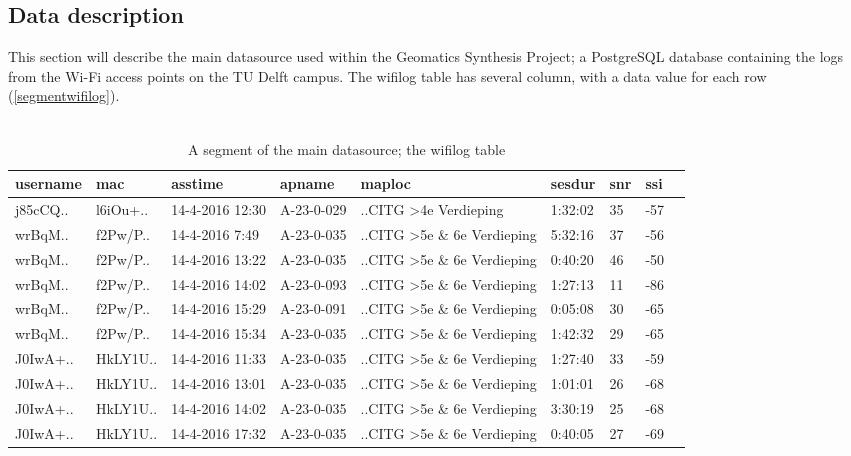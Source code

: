 \subsection{Data description}\label{datadescription}
This section will describe the main datasource used within the Geomatics Synthesis Project; a PostgreSQL database containing the logs from the Wi-Fi access points on the TU Delft campus. The wifilog table has several column, with a data value for each row (\autoref{segmentwifilog}).\\\\
\begin{table}[H]
	\centering
	\captionsetup{justification=centering}
	\caption{A segment of the main datasource; the wifilog table}
	\label{segmentwifilog}
	\begin{tabular}{@{}lllllllll@{}}
		\toprule
		\textbf{username} & \textbf{mac} & \textbf{asstime} & \textbf{apname}  & \textbf{maploc}                                                     & \textbf{sesdur} & \textbf{snr} & \textbf{ssi}          \\ \midrule
		j85cCQ..      & l6iOu+.. & 14-4-2016 12:30  & A-23-0-029 & ..CITG \textgreater 4e Verdieping       & 1:32:02         & 35           & -57\\
		wrBqM..       & f2Pw/P.. & 14-4-2016 7:49   & A-23-0-035 & ..CITG \textgreater 5e \& 6e Verdieping & 5:32:16         & 37           & -56\\
		wrBqM..       & f2Pw/P.. & 14-4-2016 13:22  & A-23-0-035 & ..CITG \textgreater 5e \& 6e Verdieping & 0:40:20         & 46           & -50\\
		wrBqM..       & f2Pw/P.. & 14-4-2016 14:02  & A-23-0-093 & ..CITG \textgreater 5e \& 6e Verdieping & 1:27:13         & 11           & -86\\
		wrBqM..       & f2Pw/P.. & 14-4-2016 15:29  & A-23-0-091 & ..CITG \textgreater 5e \& 6e Verdieping & 0:05:08         & 30           & -65\\
		wrBqM..       & f2Pw/P.. & 14-4-2016 15:34  & A-23-0-035 & ..CITG \textgreater 5e \& 6e Verdieping & 1:42:32         & 29           & -65\\
		J0IwA+..      & HkLY1U.. & 14-4-2016 11:33  & A-23-0-035 & ..CITG \textgreater 5e \& 6e Verdieping & 1:27:40         & 33           & -59\\
		J0IwA+..      & HkLY1U.. & 14-4-2016 13:01  & A-23-0-035 & ..CITG \textgreater 5e \& 6e Verdieping & 1:01:01         & 26           & -68\\
		J0IwA+..      & HkLY1U.. & 14-4-2016 14:02  & A-23-0-035 & ..CITG \textgreater 5e \& 6e Verdieping & 3:30:19         & 25           & -68\\
		J0IwA+..      & HkLY1U.. & 14-4-2016 17:32  & A-23-0-035 & ..CITG \textgreater 5e \& 6e Verdieping & 0:40:05         & 27           & -69\\ \bottomrule
	\end{tabular}
\end{table}

